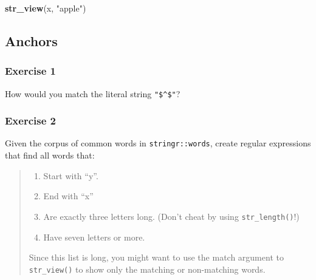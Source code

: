\documentclass[]{book}
\newenvironment{Shaded}{\begin{snugshade}}{\end{snugshade}}
\newcommand{\CharTok}[1]{\textcolor[rgb]{0.31,0.60,0.02}{#1}}
\newcommand{\KeywordTok}[1]{\textcolor[rgb]{0.13,0.29,0.53}{\textbf{#1}}}
\newcommand{\NormalTok}[1]{#1}
\newcommand{\StringTok}[1]{\textcolor[rgb]{0.31,0.60,0.02}{#1}}
\providecommand{\tightlist}{%
  \setlength{\itemsep}{0pt}\setlength{\parskip}{0pt}}
\theoremstyle{definition}
\theoremstyle{definition}
\theoremstyle{definition}
\theoremstyle{remark}
\begin{document}
\begin{Shaded}
\begin{Highlighting}[]
\KeywordTok{str_view}\NormalTok{(x, }\StringTok{"apple"}\NormalTok{)}
\end{Highlighting}
\end{Shaded}

\begin{Shaded}
\end{Shaded}

\hypertarget{anchors}{%
\subsection{Anchors}\label{anchors}}

\hypertarget{exercise-1-27}{%
\subsubsection{Exercise 1}\label{exercise-1-27}}

How would you match the literal string \texttt{"\$\^{}\$"}?

\begin{Shaded}
\end{Shaded}

\hypertarget{exercise-2-26}{%
\subsubsection{Exercise 2}\label{exercise-2-26}}

Given the corpus of common words in \texttt{stringr::words}, create
regular expressions that find all words that:

\begin{quote}
\begin{enumerate}
\def\labelenumi{\arabic{enumi}.}
\tightlist
\item
  Start with ``y''.
\item
  End with ``x''
\item
  Are exactly three letters long. (Don't cheat by using
  \texttt{str\_length()}!)
\item
  Have seven letters or more.
\end{enumerate}

Since this list is long, you might want to use the match argument to
\texttt{str\_view()} to show only the matching or non-matching words.
\end{quote}
\end{document}
